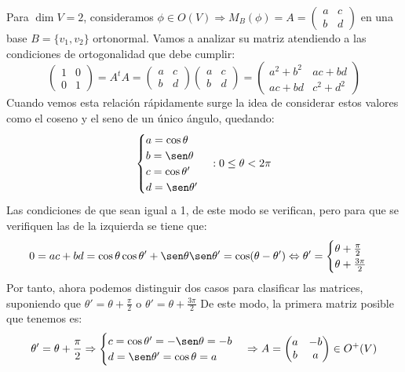 \documentclass[10pt,a4paper,openright]{book}
\theoremstyle{break}
\begin{document}
Para $\dim V = 2$, consideramos $\phi\in O(V)\Rightarrow M_B(\phi) = A = \begin{pmatrix} a & c \\ b & d\end{pmatrix}$ en una base $B = \{v_1, v_2\}$ ortonormal. Vamos a analizar su matriz atendiendo a las condiciones de ortogonalidad que debe cumplir:
$$\begin{pmatrix} 1 & 0 \\ 0 & 1 \end{pmatrix} = A^t A = \begin{pmatrix} a & c  \\ b & d \end{pmatrix} \begin{pmatrix} a & c  \\ b & d  \end{pmatrix} = \begin{pmatrix} a^2+b^2 & ac+bd  \\ ac+bd &c^2 + d^2 \end{pmatrix} $$
Cuando vemos esta relación rápidamente surge la idea de considerar estos valores como el coseno y el seno de un único ángulo, quedando:
$$\begin{cases} a = \cos \theta \\ b = \sen \theta \\ c = \cos \theta' \\ d = \sen \theta'
\end{cases}: 0 \leq \theta < 2\pi$$
Las condiciones de que sean igual a 1, de este modo se verifican, pero para que se verifiquen las de la izquierda se tiene que:
$$0 = ac+bd = \cos \theta \cos \theta ' + \sen \theta \sen \theta' = \cos(\theta - \theta ') \Leftrightarrow \theta ' = \begin{cases} \theta + \frac{\pi}{2}  \\ \theta + \frac{ 3 \pi}{2}\end{cases} $$
Por tanto, ahora podemos distinguir dos casos para clasificar las matrices, suponiendo que $\theta ' = \theta +\frac{\pi}{2}$ o $\theta ' = \theta + \frac{3\pi}{2}$
De este modo, la primera matriz posible que tenemos es:
$$\theta' = \theta +\frac{\pi}{2} \Rightarrow \begin{cases} c = \cos \theta' = -\sen \theta = -b \\ d = \sen \theta' = \cos\theta = a \end{cases} \Rightarrow A = \begin{pmatrix} a & -b \\ b & a\end{pmatrix} \in O^+(V)$$
\end{document}
